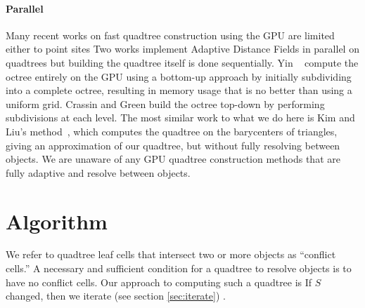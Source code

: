 \documentclass[final,3p,times,twocolumn]{elsarticle}
\begin{document}
\paragraph{Parallel} Many recent works on fast quadtree construction using the GPU are limited either to point sites \cite{bedorf2012sparse,karras2012maximizing,zhou2011data} 
 Two works \cite{bastos2008gpu,park2010cuda} implement Adaptive Distance Fields in parallel on quadtrees but building the quadtree itself is done sequentially.  Yin \etal~ compute the octree entirely on the GPU using a bottom-up approach by initially subdividing into a complete octree, resulting in memory usage that is no better than using a uniform grid. Crassin and Green \cite{crassin2012octree} build the octree top-down by performing subdivisions at each level.
The most similar work to what we do here is Kim and Liu's method~, which computes the quadtree on the barycenters of triangles, giving an approximation of our quadtree, but without fully resolving between objects.
We are unaware of any GPU quadtree construction methods that are fully adaptive and resolve between objects.

\section{Algorithm}
\label{sec:algorithm}

We refer to quadtree leaf cells that intersect two or more objects as ``conflict cells.'' A necessary and sufficient condition for a quadtree to resolve objects is to have no conflict cells. Our approach to computing such a quadtree is  If $S$ changed, then we iterate (see section \ref{sec:iterate}) . 
\end{document}
